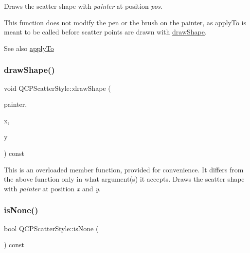 Draws the scatter shape with {\itshape painter} at position {\itshape pos}.

This function does not modify the pen or the brush on the painter, as \hyperlink{class_q_c_p_scatter_style_afd8044ece445300499ca0dc164821e0f}{apply\+To} is meant to be called before scatter points are drawn with \hyperlink{class_q_c_p_scatter_style_a89b5105e6027bfcbfeefed9d201b607c}{draw\+Shape}.

\begin{DoxySeeAlso}{See also}
\hyperlink{class_q_c_p_scatter_style_afd8044ece445300499ca0dc164821e0f}{apply\+To} 
\end{DoxySeeAlso}
\mbox{\label{class_q_c_p_scatter_style_a95c297b114c77c22428ef40f54620ddf}} 
\subsubsection{\texorpdfstring{draw\+Shape()}{drawShape()}\hspace{0.1cm}{\footnotesize\ttfamily [2/2]}}
{\footnotesize\ttfamily void Q\+C\+P\+Scatter\+Style\+::draw\+Shape (\begin{DoxyParamCaption}\item[{\hyperlink{class_q_c_p_painter}{Q\+C\+P\+Painter} $\ast$}]{painter,  }\item[{double}]{x,  }\item[{double}]{y }\end{DoxyParamCaption}) const}

This is an overloaded member function, provided for convenience. It differs from the above function only in what argument(s) it accepts. Draws the scatter shape with {\itshape painter} at position {\itshape x} and {\itshape y}. \mbox{\label{class_q_c_p_scatter_style_a72db6bcb1e1abd6e53c1315dd3dea7e4}} 
\subsubsection{\texorpdfstring{is\+None()}{isNone()}}
{\footnotesize\ttfamily bool Q\+C\+P\+Scatter\+Style\+::is\+None (\begin{DoxyParamCaption}{ }\end{DoxyParamCaption}) const\hspace{0.3cm}{\ttfamily [inline]}}

